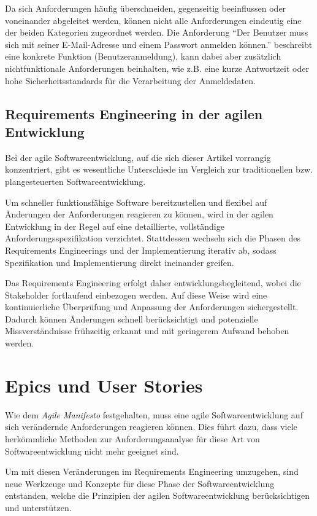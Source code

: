 \documentclass[acmtog]{acmart}
\begin{document}
Da sich Anforderungen häufig überschneiden, gegenseitig beeinflussen oder voneinander abgeleitet werden, können nicht alle Anforderungen eindeutig eine der beiden Kategorien zugeordnet werden. Die Anforderung ``Der Benutzer muss sich mit seiner E-Mail-Adresse und einem Passwort anmelden können.'' beschreibt eine konkrete Funktion (Benutzeranmeldung), kann dabei aber zusätzlich nichtfunktionale Anforderungen beinhalten, wie z.B. eine kurze Antwortzeit oder hohe Sicherheitsstandards für die Verarbeitung der Anmeldedaten.

\subsection{Requirements Engineering in der agilen Entwicklung}
Bei der agile Softwareentwicklung, auf die sich dieser Artikel vorrangig konzentriert, gibt es wesentliche Unterschiede im Vergleich zur traditionellen bzw. plangesteuerten Softwareentwicklung.

Um schneller funktionsfähige Software bereitzustellen und flexibel auf Änderungen der Anforderungen reagieren zu können, wird in der agilen Entwicklung in der Regel auf eine detaillierte, vollständige  Anforderungsspezifikation verzichtet.
Stattdessen wechseln sich die Phasen des Requirements Engineerings und der Implementierung iterativ ab, sodass Spezifikation und Implementierung direkt ineinander greifen.

Das Requirements Engineering erfolgt daher entwicklungsbegleitend, wobei die Stakeholder fortlaufend einbezogen werden. Auf diese Weise wird eine kontinuierliche Überprüfung und Anpassung der Anforderungen sichergestellt.
Dadurch können Änderungen schnell berücksichtigt und potenzielle Missverständnisse frühzeitig erkannt und mit geringerem Aufwand behoben werden.


\section{Epics und User Stories}
Wie dem \emph{Agile Manifesto} \cite{beedle_principles_2001} festgehalten, muss eine agile Softwareentwicklung
auf sich verändernde Anforderungen reagieren können.
Dies führt dazu, dass viele herkömmliche Methoden zur Anforderungsanalyse für diese Art von Softwareentwicklung
nicht mehr geeignet sind.

Um mit diesen Veränderungen im Requirements Engineering umzugehen, sind neue Werkzeuge und Konzepte
für diese Phase der Softwareentwicklung entstanden, welche die Prinzipien der agilen Softwareentwicklung
berücksichtigen und unterstützen.
\end{document}
